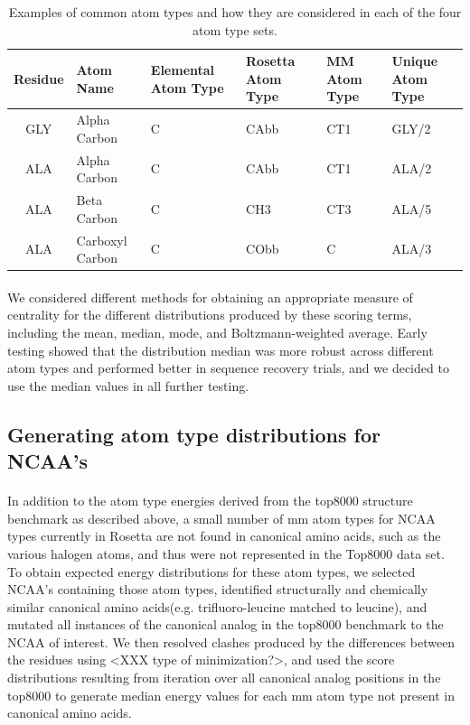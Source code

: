 \begin{table}[!htbp]

\fontsize{9pt}{9pt}
\selectfont

\begin{tabular}{c|lllll}
Residue & Atom Name & Elemental Atom Type & Rosetta Atom Type & MM Atom Type & Unique Atom Type\\
\hline
GLY & Alpha Carbon & C & CAbb & CT1 & GLY/2\\
ALA & Alpha Carbon & C & CAbb & CT1 & ALA/2\\
ALA & Beta Carbon & C & CH3 & CT3 & ALA/5\\
ALA & Carboxyl Carbon & C & CObb & C & ALA/3\\
\end{tabular}

\fontsize{10pt}{11pt}
\selectfont
\caption{Examples of common atom types and how they are considered in each of the four atom type sets.}
\label{tab:atypes_example}

\end{table}



\paragraph{}
We considered different methods for obtaining an appropriate measure of centrality for the different distributions produced by these scoring terms, including the mean, median, mode, and Boltzmann-weighted average.
Early testing showed that the distribution median was more robust across different atom types and performed better in sequence recovery trials, and we decided to use the median values in all further testing.


\subsection{Generating atom type distributions for NCAA's} 
\paragraph{}
In addition to the atom type energies derived from the top8000 structure benchmark as described above, a small number of mm atom types for NCAA types currently in Rosetta are not found in canonical amino acids, such as the various halogen atoms, and thus were not represented in the Top8000 data set.
To obtain expected energy distributions for these atom types, we selected NCAA's containing those atom types, identified structurally and chemically similar canonical amino acids(e.g. trifluoro-leucine matched to leucine), and mutated all instances of the canonical analog in the top8000 benchmark to the NCAA of interest.
We then resolved clashes produced by the differences between the residues using <XXX type of minimization?>, and used the score distributions resulting from iteration over all canonical analog positions in the top8000 to generate median energy values for each mm atom type not present in canonical amino acids.


